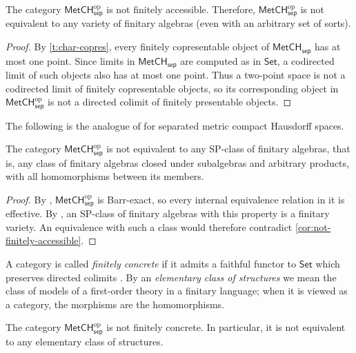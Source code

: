 \documentclass[11pt]{amsart}
\theoremstyle{definition}
\newcommand{\cat}[1]{\mathsf{#1}}
\newcommand{\op}{\mathrm{op}}
\newcommand{\MetCHsep}{\cat{MetCH_{sep}}}
\newcommand{\MetCHsepop}{\cat{MetCH}_\cat{sep}^\op}
\newcommand{\Set}{\cat{Set}}
\begin{document}
\begin{corollary}
  \label{cor:not-finitely-accessible}
  The category $\MetCHsepop$ is not finitely accessible.
  Therefore, $\MetCHsepop$ is not equivalent to any variety of finitary algebras (even with an arbitrary set of sorts).
\end{corollary}

\begin{proof}
  By \cref{t:char-copres}, every finitely copresentable object of $\MetCHsep$ has at most one point.
  Since limits in $\MetCHsep$ are computed as in $\Set$, a codirected limit of such objects also has at most one point.
  Thus a two-point space is not a codirected limit of finitely copresentable objects, so its corresponding object in $\MetCHsepop$ is not a directed colimit of finitely presentable objects.
\end{proof}

The following is the analogue of \cite[Cor.~22]{AR20} for separated metric compact Hausdorff spaces.

\begin{corollary}
  The category $\MetCHsepop$ is not equivalent to any $\mathrm{SP}$-class of finitary algebras, that is, any class of finitary algebras closed under subalgebras and arbitrary products, with all homomorphisms between its members.
\end{corollary}

\begin{proof}
  By \cite[Thm.~5.16]{AH25}, $\MetCHsepop$ is Barr-exact, so every internal equivalence relation in it is effective.
  By \cite{Ban83}, an $\mathrm{SP}$-class of finitary algebras with this property is a finitary variety.
  An equivalence with such a class would therefore contradict \cref{cor:not-finitely-accessible}.
\end{proof}


A category is called \emph{finitely concrete} if it admits a faithful functor to \(\Set\) which preserves directed colimits \cite{LRV23}. By an \emph{elementary class of structures} we mean the class of models of a first-order theory in a finitary language; when it is viewed as a category, the morphisms are the homomorphisms.

\begin{proposition}
  \label{prop:not-finitely-concrete}
  The category \(\MetCHsepop\) is not finitely concrete.
  In particular, it is not equivalent to any elementary class of structures.
\end{proposition}
\end{document}
